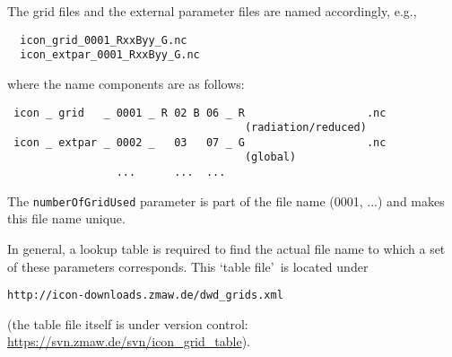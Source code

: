 The grid files and the external parameter files are named accordingly, e.g.,
\begin{small}
 \begin{verbatim}
  icon_grid_0001_RxxByy_G.nc
  icon_extpar_0001_RxxByy_G.nc 
 \end{verbatim}
\end{small}
where the name components are as follows:
\begin{small}
 \begin{verbatim}
 icon _	grid   _ 0001 _	R 02 B 06 _	R                   .nc 
                                     (radiation/reduced)
 icon _ extpar _ 0002 _	  03   07 _	G                   .nc
                                     (global)         
                 ...      ...  ...
 \end{verbatim}
\end{small}

The \verb+numberOfGridUsed+ parameter is part of the file name (0001, ...) and makes this file name unique.

In general, a lookup table is required to find the actual file name to which a set of these parameters corresponds. 
This \lq table file\rq\ is located under 
\begin{center}
  {\tt http://icon-downloads.zmaw.de/dwd\_grids.xml} 
\end{center}
(the table file itself is under version control: \href{https://svn.zmaw.de/svn/icon\_grid\_table}{https://svn.zmaw.de/svn/icon\_grid\_table}). 



